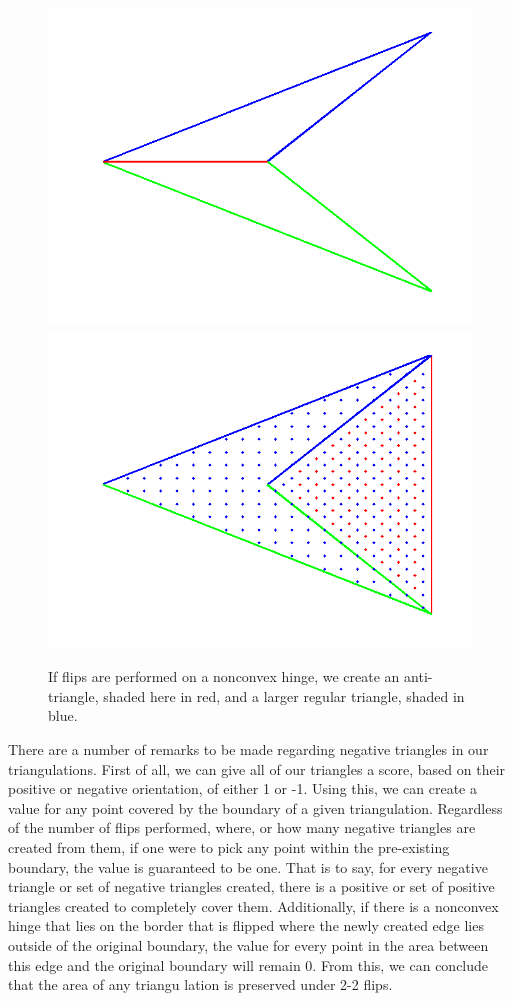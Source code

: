 \documentclass[12pt]{article}
\begin{document}
\begin{figure}
\label{antitri}
\centering
\includegraphics[scale = 0.4]{Pictures3/antitri1.png}
\includegraphics[scale = 0.4]{Pictures3/antitri2.png}
\caption{If flips are performed on a nonconvex hinge, we create an anti-triangle, shaded here in red, and a larger regular triangle, shaded in blue.}
\label{AntiTri}
\end{figure}

 There are a number of remarks to be made regarding negative triangles in our triangulations. First of all, we can give all of our triangles a score, based on their positive or negative orientation, of either 1 or -1. Using this, we can create a value for any point covered by the boundary of a given triangulation. Regardless of the number of flips performed, where, or how many negative triangles are created from them, if one were to pick any point within the pre-existing boundary, the value is guaranteed to be one. That is to say, for every negative triangle or set of negative triangles created, there is a positive or set of positive triangles created to completely cover them. Additionally, if there is a nonconvex hinge that lies on the border that is flipped where the newly created edge lies outside of the original boundary, the value for every point in the area between this edge and the original boundary will remain 0. From this, we can conclude that the area of any triangu
 lation is preserved under 2-2 flips.
\end{document}
